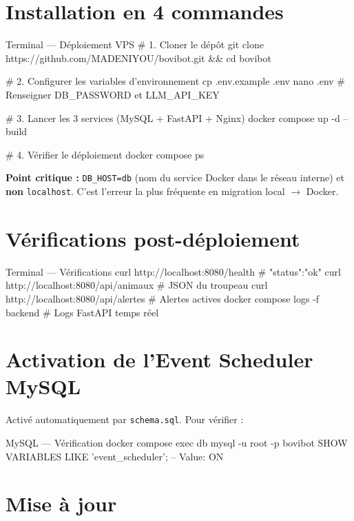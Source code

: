 \documentclass[12pt, a4paper, oneside]{report}
\begin{document}
\section{Installation en 4 commandes}

\begin{bashbox}{Terminal — Déploiement VPS}
# 1. Cloner le dépôt
git clone https://github.com/MADENIYOU/bovibot.git && cd bovibot

# 2. Configurer les variables d'environnement
cp .env.example .env
nano .env          # Renseigner DB_PASSWORD et LLM_API_KEY

# 3. Lancer les 3 services (MySQL + FastAPI + Nginx)
docker compose up -d --build

# 4. Vérifier le déploiement
docker compose ps
\end{bashbox}

\begin{warnbox}
  \textbf{Point critique :} \texttt{DB\_HOST=db} (nom du service Docker dans le réseau
  interne) et \textbf{non} \texttt{localhost}. C'est l'erreur la plus fréquente en
  migration local $\to$ Docker.
\end{warnbox}

\section{Vérifications post-déploiement}

\begin{bashbox}{Terminal — Vérifications}
curl http://localhost:8080/health      # {"status":"ok"}
curl http://localhost:8080/api/animaux # JSON du troupeau
curl http://localhost:8080/api/alertes # Alertes actives
docker compose logs -f backend         # Logs FastAPI temps réel
\end{bashbox}

\section{Activation de l'Event Scheduler MySQL}

Activé automatiquement par \texttt{schema.sql}. Pour vérifier :

\begin{bashbox}{MySQL — Vérification}
docker compose exec db mysql -u root -p bovibot
SHOW VARIABLES LIKE 'event_scheduler';  -- Value: ON
\end{bashbox}

\section{Mise à jour}
\end{document}
